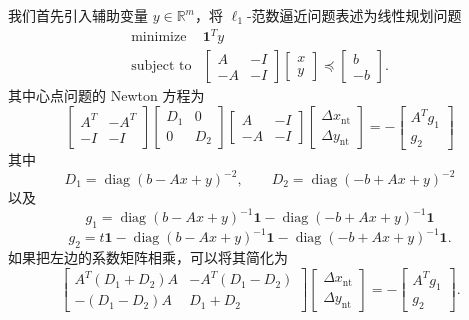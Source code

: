 \documentclass[UTF8, 12pt, fontset=fandol, oneside]{ctexart}
\begin{document}
我们首先引入辅助变量 $y\in\mathbb{R}^m$，将 $\ell_1$-范数逼近问题表述为线性规划问题
\[
\begin{array}{ll}
\text{minimize} & \mathbf{1}^Ty\\
\text{subject to} &
\begin{bmatrix}
A & -I\\
-A & -I
\end{bmatrix}
\begin{bmatrix}
x\\
y
\end{bmatrix}
\preceq
\begin{bmatrix}
b\\
-b
\end{bmatrix}.
\end{array}
\]
其中心点问题的 Newton 方程为
\[
\begin{bmatrix}
A^T & -A^T\\
-I & -I
\end{bmatrix}
\begin{bmatrix}
D_1 & 0\\
0 & D_2
\end{bmatrix}
\begin{bmatrix}
A & -I\\
-A & -I
\end{bmatrix}
\begin{bmatrix}
\Delta x_{\mathrm{nt}}\\
\Delta y_{\mathrm{nt}}
\end{bmatrix}
=-
\begin{bmatrix}
A^Tg_1\\
g_2
\end{bmatrix}
\]
其中
\[
D_1=\operatorname{diag}(b-Ax+y)^{-2},\qquad
D_2=\operatorname{diag}(-b+Ax+y)^{-2}
\]
以及
\[
g_1=\operatorname{diag}(b-Ax+y)^{-1}\mathbf{1}
-\operatorname{diag}(-b+Ax+y)^{-1}\mathbf{1}
\]
\[
g_2=t\mathbf{1}-\operatorname{diag}(b-Ax+y)^{-1}\mathbf{1}
-\operatorname{diag}(-b+Ax+y)^{-1}\mathbf{1}.
\]
如果把左边的系数矩阵相乘，可以将其简化为
\[
\begin{bmatrix}
A^T(D_1+D_2)A & -A^T(D_1-D_2)\\
-(D_1-D_2)A & D_1+D_2
\end{bmatrix}
\begin{bmatrix}
\Delta x_{\mathrm{nt}}\\
\Delta y_{\mathrm{nt}}
\end{bmatrix}
=-
\begin{bmatrix}
A^Tg_1\\
g_2
\end{bmatrix}.
\]
\end{document}
